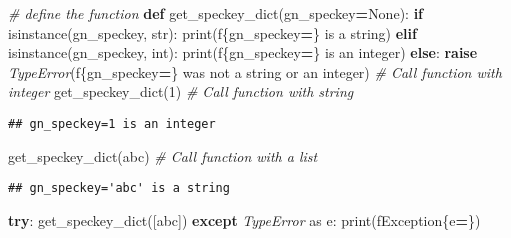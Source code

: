 \documentclass[
]{book}
\newenvironment{Shaded}{\begin{snugshade}}{\end{snugshade}}
\newcommand{\BuiltInTok}[1]{#1}
\newcommand{\CommentTok}[1]{\textcolor[rgb]{0.56,0.35,0.01}{\textit{#1}}}
\newcommand{\ControlFlowTok}[1]{\textcolor[rgb]{0.13,0.29,0.53}{\textbf{#1}}}
\newcommand{\DecValTok}[1]{\textcolor[rgb]{0.00,0.00,0.81}{#1}}
\newcommand{\ImportTok}[1]{#1}
\newcommand{\KeywordTok}[1]{\textcolor[rgb]{0.13,0.29,0.53}{\textbf{#1}}}
\newcommand{\NormalTok}[1]{#1}
\newcommand{\OperatorTok}[1]{\textcolor[rgb]{0.81,0.36,0.00}{\textbf{#1}}}
\newcommand{\PreprocessorTok}[1]{\textcolor[rgb]{0.56,0.35,0.01}{\textit{#1}}}
\newcommand{\SpecialCharTok}[1]{\textcolor[rgb]{0.00,0.00,0.00}{#1}}
\newcommand{\SpecialStringTok}[1]{\textcolor[rgb]{0.31,0.60,0.02}{#1}}
\newcommand{\StringTok}[1]{\textcolor[rgb]{0.31,0.60,0.02}{#1}}
\newcommand{\VariableTok}[1]{\textcolor[rgb]{0.00,0.00,0.00}{#1}}
\begin{document}
\begin{Shaded}
\begin{Highlighting}[]
\CommentTok{\# define the function}
\KeywordTok{def}\NormalTok{ get\_speckey\_dict(gn\_speckey}\OperatorTok{=}\VariableTok{None}\NormalTok{):}
    \ControlFlowTok{if} \BuiltInTok{isinstance}\NormalTok{(gn\_speckey, }\BuiltInTok{str}\NormalTok{):}
        \BuiltInTok{print}\NormalTok{(}\SpecialStringTok{f\textquotesingle{}}\SpecialCharTok{\{}\NormalTok{gn\_speckey}\OperatorTok{=}\SpecialCharTok{\}}\SpecialStringTok{ is a string\textquotesingle{}}\NormalTok{)}
    \ControlFlowTok{elif} \BuiltInTok{isinstance}\NormalTok{(gn\_speckey, }\BuiltInTok{int}\NormalTok{):}
        \BuiltInTok{print}\NormalTok{(}\SpecialStringTok{f\textquotesingle{}}\SpecialCharTok{\{}\NormalTok{gn\_speckey}\OperatorTok{=}\SpecialCharTok{\}}\SpecialStringTok{ is an integer\textquotesingle{}}\NormalTok{)}
    \ControlFlowTok{else}\NormalTok{:}
        \ControlFlowTok{raise} \PreprocessorTok{TypeError}\NormalTok{(}\SpecialStringTok{f\textquotesingle{}}\SpecialCharTok{\{}\NormalTok{gn\_speckey}\OperatorTok{=}\SpecialCharTok{\}}\SpecialStringTok{ was not a string or an integer\textquotesingle{}}\NormalTok{)}
\CommentTok{\# Call function with integer}
\NormalTok{get\_speckey\_dict(}\DecValTok{1}\NormalTok{)}
\CommentTok{\# Call function with string}
\end{Highlighting}
\end{Shaded}

\begin{verbatim}
## gn_speckey=1 is an integer
\end{verbatim}

\begin{Shaded}
\begin{Highlighting}[]
\NormalTok{get\_speckey\_dict(}\StringTok{\textquotesingle{}abc\textquotesingle{}}\NormalTok{)}
\CommentTok{\# Call function with a list}
\end{Highlighting}
\end{Shaded}

\begin{verbatim}
## gn_speckey='abc' is a string
\end{verbatim}

\begin{Shaded}
\begin{Highlighting}[]
\ControlFlowTok{try}\NormalTok{: }
\NormalTok{    get\_speckey\_dict([}\StringTok{\textquotesingle{}abc\textquotesingle{}}\NormalTok{])}
\ControlFlowTok{except} \PreprocessorTok{TypeError} \ImportTok{as}\NormalTok{ e: }
    \BuiltInTok{print}\NormalTok{(}\SpecialStringTok{f\textquotesingle{}Exception}\SpecialCharTok{\{e}\OperatorTok{=}\SpecialCharTok{\}}\SpecialStringTok{\textquotesingle{}}\NormalTok{)}
\end{Highlighting}
\end{Shaded}
\end{document}
